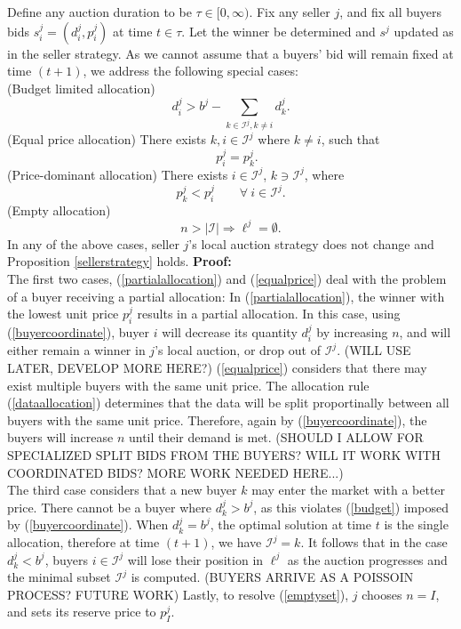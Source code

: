\documentclass[12pt]{article}
\theoremstyle{definition}
\newcommand{\mcI}{\mathcal{I}}
\begin{document}
\begin{multicols}{2}
{
\label{buyerresponse}
Define any auction duration to be $\tau \in [0,\infty)$. 
Fix any seller $j$, and fix all buyers bids $s_i^j=(d_i^j,p_i^j)$ at time $t\in\tau$. Let the
winner be determined and $s^j$ updated as in the seller strategy. As we cannot
assume that a buyers' bid will remain fixed at time $(t+1)$,
we address the following special cases:\\
(Budget limited allocation)
\begin{equation}\label{partialallocation}
    d_i^j > b^j - \sum_{k\in\mcI^j, k\ne i} d_k^j.
\end{equation}
(Equal price allocation)
There exists $k,i \in \mcI^j$ where $k\ne i$, such that
\begin{equation}\label{equalprice}
    \quad p_i^j = p_k^j.
\end{equation}
(Price-dominant allocation)
There exists $i \in \mcI^j$, $k \ni \mcI^j$, where
\begin{equation}\label{newbuyer}
    p_k^j < p_i^j \qquad \forall \ i \in \mcI^j.
\end{equation}
(Empty allocation)
\begin{equation}\label{emptyset}
    n > \vert \mcI\vert \Rightarrow \ell^j = \emptyset.
\end{equation}
In any of the above cases, seller $j$'s local auction strategy does not change and
Proposition \ref{sellerstrategy} holds.
}
\textbf{Proof:} \\
The first two cases, (\ref{partialallocation}) and (\ref{equalprice}) deal with
the problem of a buyer receiving a partial allocation:
In (\ref{partialallocation}), the winner with the lowest unit price $p_i^j$ results in a partial
allocation. In this case, using (\ref{buyercoordinate}), buyer $i$ will decrease its
quantity $d_i^j$ by increasing $n$, and will either remain a winner in $j$'s local
auction, or drop out of $\mcI^j$. (WILL USE LATER, DEVELOP MORE HERE?)
(\ref{equalprice}) considers that there may exist multiple buyers with the same unit price. The allocation rule (\ref{dataallocation}) determines that the data will be split proportinally
between all buyers with the same unit price. Therefore, again by
(\ref{buyercoordinate}), the buyers will increase $n$ until their demand is
met. (SHOULD I ALLOW FOR SPECIALIZED SPLIT BIDS FROM THE BUYERS? WILL IT WORK
WITH COORDINATED BIDS? MORE WORK NEEDED HERE...)\\
The third case considers that a new buyer $k$ may enter the market with a better
price. There cannot be a buyer where $d_k^j > b^j$, as this violates
(\ref{budget}) imposed by (\ref{buyercoordinate}). When $d_k^j =
b^j$, the optimal solution at time $t$ is the single allocation, therefore at
time $(t+1)$, we have $\mcI^j = k$. It follows that in the case $d_k^j < b^j$, buyers $i\in\mcI^j$ will
lose their position in $\ell^j$ as the auction progresses and the minimal
subset $\mcI^j$ is computed. 
(BUYERS ARRIVE AS A POISSOIN PROCESS? FUTURE WORK)
Lastly, to resolve (\ref{emptyset}), $j$ chooses $n=I$, and sets its reserve price to $p_I^j$. 


\end{multicols}
\end{document}
